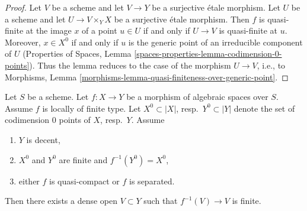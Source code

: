 \begin{proof}
Let $V$ be a scheme and let $V \to Y$ be a surjective \'etale morphism.
Let $U$ be a scheme and let $U \to V \times_Y X$ be a surjective \'etale
morphism. Then $f$ is quasi-finite at the image $x$ of a point $u \in U$
if and only if $U \to V$ is quasi-finite at $u$. Moreover, $x \in X^0$
if and only if $u$ is the generic point of an irreducible component
of $U$ (Properties of Spaces, Lemma
\ref{spaces-properties-lemma-codimension-0-points}).
Thus the lemma reduces to the case of the morphism $U \to V$, i.e., to
Morphisms, Lemma \ref{morphisms-lemma-quasi-finiteness-over-generic-point}.
\end{proof}

\begin{lemma}
\label{lemma-finite-over-dense-open}
Let $S$ be a scheme. Let $f : X \to Y$ be a morphism of algebraic spaces
over $S$. Assume $f$ is locally of finite type.
Let $X^0 \subset |X|$, resp.\ $Y^0 \subset |Y|$ denote the set of
codimension $0$ points of $X$, resp.\ $Y$. Assume
\begin{enumerate}
\item $Y$ is decent,
\item $X^0$ and $Y^0$ are finite and $f^{-1}(Y^0) = X^0$,
\item either $f$ is quasi-compact or $f$ is separated.
\end{enumerate}
Then there exists a dense open $V \subset Y$
such that $f^{-1}(V) \to V$ is finite.
\end{lemma}

